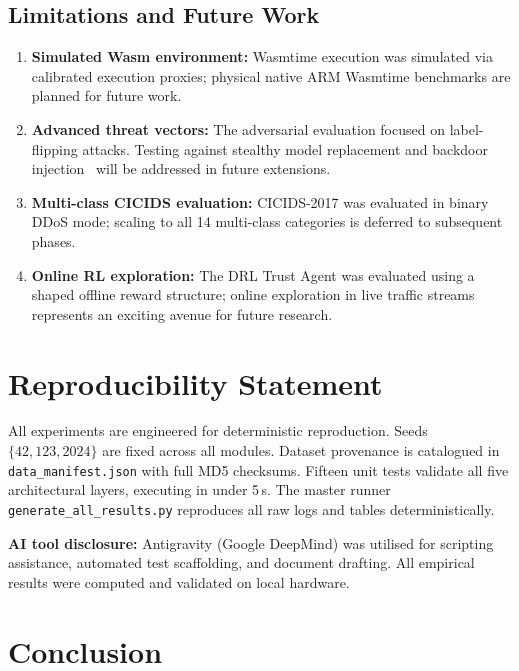 \documentclass[iicol,sn-mathphys,Numbered]{sn-jnl}
\begin{document}
\subsection{Limitations and Future Work}
\begin{enumerate}
  \item \textbf{Simulated Wasm environment:} Wasmtime execution was simulated via calibrated execution proxies; physical native ARM Wasmtime benchmarks are planned for future work.
  \item \textbf{Advanced threat vectors:} The adversarial evaluation focused on label-flipping attacks. Testing against stealthy model replacement and backdoor injection~\cite{bagdasaryan2020} will be addressed in future extensions.
  \item \textbf{Multi-class CICIDS evaluation:} CICIDS-2017 was evaluated in binary DDoS mode; scaling to all 14 multi-class categories is deferred to subsequent phases.
  \item \textbf{Online RL exploration:} The DRL Trust Agent was evaluated using a shaped offline reward structure; online exploration in live traffic streams represents an exciting avenue for future research.
\end{enumerate}

\section{Reproducibility Statement}\label{sec:repro}

All experiments are engineered for deterministic reproduction. Seeds $\{42, 123, 2024\}$ are fixed across all modules. Dataset provenance is catalogued in \texttt{data\_manifest.json} with full MD5 checksums. Fifteen unit tests validate all five architectural layers, executing in under 5\,s. The master runner \texttt{generate\_all\_results.py} reproduces all raw logs and tables deterministically.

\textbf{AI tool disclosure:} Antigravity (Google DeepMind) was utilised for scripting assistance, automated test scaffolding, and document drafting. All empirical results were computed and validated on local hardware.

\section{Conclusion}\label{sec:conclusion}
\end{document}
